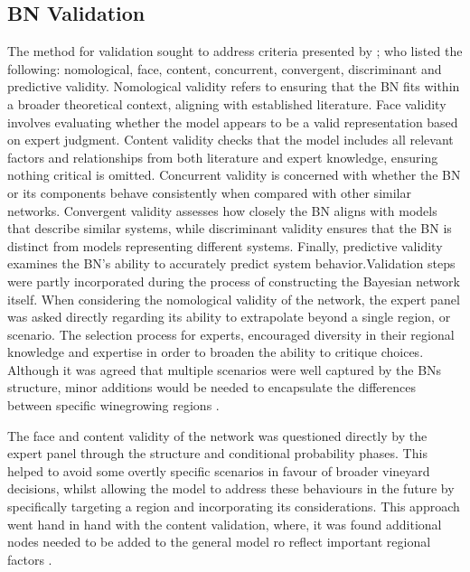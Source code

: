 \documentclass[fleqn,10pt]{wlscirep}
\begin{document}
\subsection{BN Validation}

The method for validation sought to address criteria presented by ; who listed the following:  nomological, face, content, concurrent, convergent, discriminant and predictive validity. Nomological validity refers to ensuring that the BN fits within a broader theoretical context, aligning with established literature. Face validity involves evaluating whether the model appears to be a valid representation based on expert judgment. Content validity checks that the model includes all relevant factors and relationships from both literature and expert knowledge, ensuring nothing critical is omitted. Concurrent validity is concerned with whether the BN or its components behave consistently when compared with other similar networks. Convergent validity assesses how closely the BN aligns with models that describe similar systems, while discriminant validity ensures that the BN is distinct from models representing different systems. Finally, predictive validity examines the BN's ability to accurately predict system behavior.Validation steps were partly incorporated during the process of constructing the Bayesian network itself. When considering the nomological validity of the network, the expert panel was asked directly regarding its ability to extrapolate beyond a single region, or scenario. The selection process for experts, encouraged diversity in their regional knowledge and expertise in order to broaden the ability to critique choices. Although it was agreed that multiple scenarios were well captured by the BNs structure, minor additions would be needed to encapsulate the differences between specific winegrowing regions .

The face and content validity of the network was questioned directly by the expert panel through the structure and conditional probability phases. This helped to avoid some overtly specific scenarios in favour of broader vineyard decisions, whilst allowing the model to address these behaviours in the future by specifically targeting a region and incorporating its considerations. This approach went hand in hand with the content validation, where, it was found additional nodes needed to be added to the general model ro reflect important regional factors . 
\end{document}

